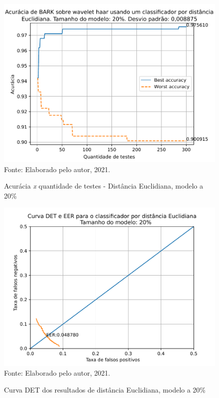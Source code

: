 			\begin{figure}[H]
				\centering
				\caption{Acurácia \textit{x} quantidade de testes - Distância Euclidiana, modelo a 20\%}
				\includegraphics[width=.9\linewidth]{images/results/confusionMatrices/classifier_Euclidian_20}
				\label{fig:classifiereuclidian20}
				\\Fonte: Elaborado pelo autor, 2021.
			\end{figure}
		
			\begin{figure}[H]
				\centering
				\caption{Curva DET dos resultados de distância Euclidiana, modelo a 20\%}
				\includegraphics[width=.9\linewidth]{images/results/det/DET_for_classifier_Euclidian_20}
				\label{fig:detforclassifiereuclidian20}
				\\Fonte: Elaborado pelo autor, 2021.
			\end{figure}

